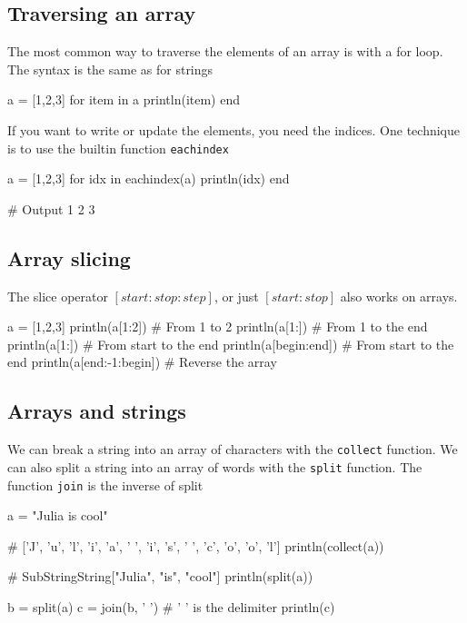 \documentclass{report}
\begin{document}
    \bigbreak \noindent 
    \subsection{Traversing an array}
    \bigbreak \noindent 
    The most common way to traverse the elements of an array is with a for loop. The
    syntax is the same as for strings
    \bigbreak \noindent 
    \begin{jlcode}
        a = [1,2,3]
        for item in a
            println(item)
        end
    \end{jlcode}
    \bigbreak \noindent 
    If you want to write or update the elements, you need the indices. One technique is to use the builtin function \texttt{eachindex}
    \bigbreak \noindent 
    \begin{jlcode}
        a = [1,2,3]
        for idx in eachindex(a)
            println(idx)
        end

        # Output
            1
            2
            3
    \end{jlcode}

    \bigbreak \noindent 
    \subsection{Array slicing}
    \bigbreak \noindent 
    The slice operator $[start:stop:step]$, or just $[start:stop]$ also works on arrays. 
    \bigbreak \noindent 
    \begin{jlcode}
        a = [1,2,3]
        println(a[1:2]) # From 1 to 2
        println(a[1:]) # From 1 to the end
        println(a[1:]) # From start to the end
        println(a[begin:end]) # From start to the end
        println(a[end:-1:begin]) # Reverse the array
    \end{jlcode}

    \bigbreak \noindent 
    \subsection{Arrays and strings}
    \bigbreak \noindent 
    We can break a string into an array of characters with the \texttt{collect} function. We can also split a string into an array of words with the \texttt{split} function. The function \texttt{join} is the inverse of split
    \bigbreak \noindent 
    \begin{jlcode}
a = "Julia is cool"

# ['J', 'u', 'l', 'i', 'a', ' ', 'i', 's', ' ', 'c', 'o', 'o', 'l']
println(collect(a)) 

# SubString{String}["Julia", "is", "cool"]
println(split(a))

b = split(a)
c = join(b, ' ') # ' ' is the delimiter
println(c)
    \end{jlcode}
\end{document}
